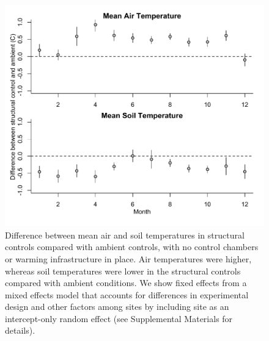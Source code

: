 \documentclass{article}
\begin{document}
 \begin{figure}[h]
     \centering
 \includegraphics{../figures/ShamVSAmbient_mean.pdf}    
 \caption{Difference between mean air and soil temperatures in structural controls compared with ambient controls, with no control chambers or warming infrastructure in place. Air temperatures were higher, whereas soil temperatures were lower in the structural controls compared with ambient conditions. We show fixed effects from a mixed effects model that accounts for differences in experimental design and other factors among sites by including site as an intercept-only random effect (see Supplemental Materials for details). } %
 \end{figure}
 \clearpage
\end{document}
